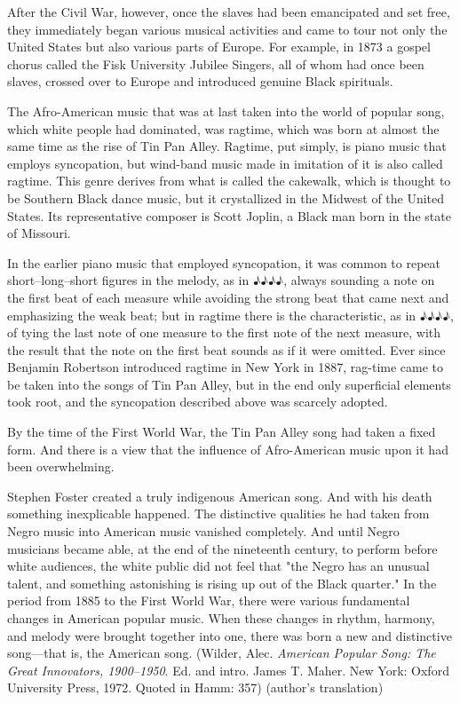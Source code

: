 After the Civil War, however, once the slaves had been emancipated and set free, they immediately began various musical activities and came to tour not only the United States but also various parts of Europe. For example, in 1873 a gospel chorus called the Fisk University Jubilee Singers, all of whom had once been slaves, crossed over to Europe and introduced genuine Black spirituals.

The Afro-American music that was at last taken into the world of popular song, which white people had dominated, was ragtime, which was born at almost the same time as the rise of Tin Pan Alley. Ragtime, put simply, is piano music that employs syncopation, but wind-band music made in imitation of it is also called ragtime. This genre derives from what is called the cakewalk, which is thought to be Southern Black dance music, but it crystallized in the Midwest of the United States. Its representative composer is Scott Joplin, a Black man born in the state of Missouri.

In the earlier piano music that employed syncopation, it was common to repeat short–long–short figures in the melody, as in ♪♪♪♪, always sounding a note on the first beat of each measure while avoiding the strong beat that came next and emphasizing the weak beat; but in ragtime there is the characteristic, as in ♪♪♪♪, of tying the last note of one measure to the first note of the next measure, with the result that the note on the first beat sounds as if it were omitted. Ever since Benjamin Robertson introduced ragtime in New York in 1887, rag-time came to be taken into the songs of Tin Pan Alley, but in the end only superficial elements took root, and the syncopation described above was scarcely adopted.

By the time of the First World War, the Tin Pan Alley song had taken a fixed form. And there is a view that the influence of Afro-American music upon it had been overwhelming.

\begin{gquote}
Stephen Foster created a truly indigenous American song. And with his death something inexplicable happened. The distinctive qualities he had taken from Negro music into American music vanished completely. And until Negro musicians became able, at the end of the nineteenth century, to perform before white audiences, the white public did not feel that "the Negro has an unusual talent, and something astonishing is rising up out of the Black quarter." In the period from 1885 to the First World War, there were various fundamental changes in American popular music. When these changes in rhythm, harmony, and melody were brought together into one, there was born a new and distinctive song—that is, the American song. (Wilder, Alec. \textit{American Popular Song: The Great Innovators, 1900–1950}. Ed. and intro. James T. Maher. New York: Oxford University Press, 1972. Quoted in Hamm: 357) (author's translation)
\end{gquote}

